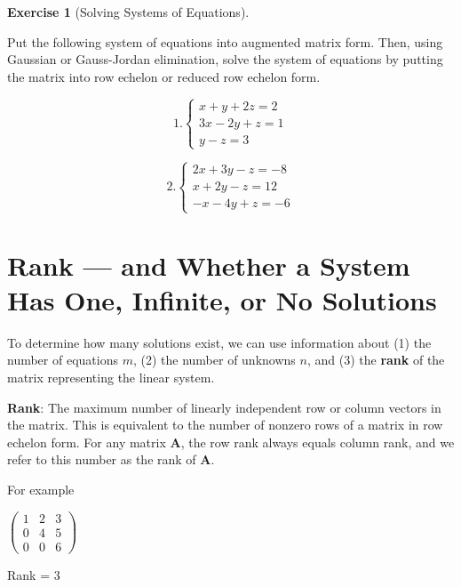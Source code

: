 \documentclass[
]{book}
\theoremstyle{definition}
\theoremstyle{definition}
\theoremstyle{definition}
\newtheorem{exercise}{Exercise}[chapter]
\theoremstyle{definition}
\theoremstyle{remark}
\begin{document}
\begin{exercise}[Solving Systems of Equations]
\protect\hypertarget{exr:solvesys1}{}{\label{exr:solvesys1} {} }

Put the following system of equations into augmented matrix form. Then, using Gaussian or Gauss-Jordan elimination, solve the system of equations by putting the matrix into row echelon or reduced row echelon form.

\[
  1. \begin{cases}
               x + y + 2z = 2\\
               3x - 2y + z = 1\\
               y - z = 3
            \end{cases}
               \]

\[
  2. \begin{cases}
               2x + 3y - z = -8\\
               x + 2y - z = 12\\
             -x -4y + z = -6
            \end{cases}
               \]
\end{exercise}

\hypertarget{rank-and-whether-a-system-has-one-infinite-or-no-solutions}{%
\section{Rank --- and Whether a System Has One, Infinite, or No Solutions}\label{rank-and-whether-a-system-has-one-infinite-or-no-solutions}}

To determine how many solutions exist, we can use information about (1) the number of equations \(m\), (2) the number of unknowns \(n\), and (3) the \textbf{rank} of the matrix representing the linear system.

\textbf{Rank}: The maximum number of linearly independent row or column vectors in the matrix. This is equivalent to the number of nonzero rows of a matrix in row echelon form. For any matrix \textbf{A}, the row rank always equals column rank, and we refer to this number as the rank of \textbf{A}.

For example

\(\begin{pmatrix} 1 & 2 & 3 \\  0 & 4 & 5 \\  0 & 0 & 6 \end{pmatrix}\)

Rank = 3
\end{document}
